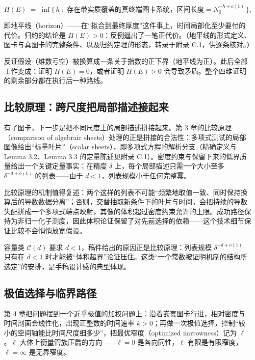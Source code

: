 \begin{equation}
H(E)\;=\;\inf\{\, h \;:\; \text{存在带实质覆盖的真终端图卡系统，区间长度} = N_0^{-h+o(1)} \,\},
\end{equation}

即地平线（horizon）——在“拟合到最终厚度”这件事上，时间局部化至少要付的代价。归约的结论是 $H(E)>0$：反例逼出了一笔正代价。（地平线的形式定义、图卡与真图卡的完整条件、以及归约定理的形态，转录于附录 C.1，供逐条核对。）

\begin{keybox}[归约的要点]
反证假设（维数亏空）被换算成一条关于指数的正下界（地平线为正）。此后全部工作变成：证明 $H(E)=0$，或者证明 $H(E)>0$ 会导致矛盾。整个四维证明的剩余部分都在执行后一种路线。
\end{keybox}

\subsection{比较原理：跨尺度把局部描述接起来}

有了图卡，下一步是把不同尺度上的局部描述拼接起来。第 3 章的比较原理（comparison of algebraic sheets）处理的正是拼接的合法性：多项式测试的局部图像给出“标量叶片”（scalar sheets），即多项式方程的解析分支（精确定义与 Lemma 3.2、Lemma 3.3 的定量陈述见附录 C.1）。密度约束与保留下来的低界质量给出一个关键定量事实：在精度 $\delta$ 上，每个局部描述只需一个大小至多 $\delta^{-d+o(1)}$ 的列表——由于 $d<1$，列表规模小于任何完整幂。

比较原理的机制值得复述：两个这样的列表不可能“频繁地取值一致、同时保持换算后的导数数据分离”；否则，交替抽取新条件下的叶片与时间，会把持续的导数失配拼成一个多项式端点映射，其像的体积超过密度约束允许的上限。成功路径保持为非归一化子测度，因此体积论证保留了对先前选择的依赖——这个技术细节保证比较不会悄悄放宽假设。

\begin{evbox}[证据：d<1 与比较原理的耦合]
容量类 $\mathcal{C}(d)$ 要求 $d<1$，稿件给出的原因正是比较原理：列表规模 $\delta^{-d+o(1)}$ 只有在 $d<1$ 时才能被“体积超界”论证压住。这类“一个常数被证明机制的结构所选定”的安排，是手稿设计感的典型体现。
\end{evbox}

\subsection{极值选择与临界路径}

第 4 章把问题摆到一个近乎极值的加权问题上：沿着嵌套图卡行进，相对密度与时间剖面会线性化，出现正整数的时间速率 $k>0$；再做一次极值选择，控制“较小的空间轴能比时间尺度细多少”，把最优窄度（optimized narrowness）记为 $\ell$。$\ell$ 大体上衡量管族压扁的方向——$\ell=0$ 是各向同性，$\ell$ 有限是有限窄度，$\ell=\infty$ 是无界窄度。

